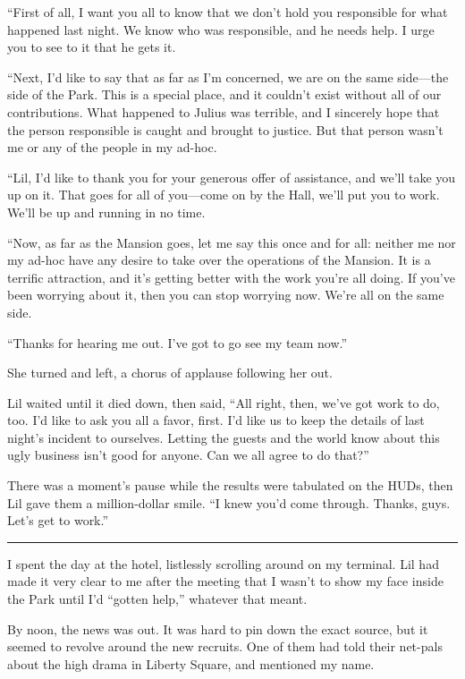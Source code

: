 “First of all, I want you all to know that we don't hold you
responsible for what happened last night. We know who was
responsible, and he needs help. I urge you to see to it that he
gets it.

“Next, I'd like to say that as far as I'm concerned, we are on the
same side—the side of the Park. This is a special place, and it
couldn't exist without all of our contributions. What happened to
Julius was terrible, and I sincerely hope that the person
responsible is caught and brought to justice. But that person
wasn't me or any of the people in my ad-hoc.

“Lil, I'd like to thank you for your generous offer of assistance,
and we'll take you up on it. That goes for all of you—come on by
the Hall, we'll put you to work. We'll be up and running in no
time.

“Now, as far as the Mansion goes, let me say this once and for all:
neither me nor my ad-hoc have any desire to take over the
operations of the Mansion. It is a terrific attraction, and it's
getting better with the work you're all doing. If you've been
worrying about it, then you can stop worrying now. We're all on the
same side.

“Thanks for hearing me out. I've got to go see my team now.”

She turned and left, a chorus of applause following her out.

Lil waited until it died down, then said, “All right, then, we've
got work to do, too. I'd like to ask you all a favor, first. I'd
like us to keep the details of last night's incident to ourselves.
Letting the guests and the world know about this ugly business
isn't good for anyone. Can we all agree to do that?”

There was a moment's pause while the results were tabulated on the
HUDs, then Lil gave them a million-dollar smile. “I knew you'd come
through. Thanks, guys. Let's get to work.”

\begin{center}\rule{3in}{0.4pt}\end{center}

I spent the day at the hotel, listlessly scrolling around on my
terminal. Lil had made it very clear to me after the meeting that I
wasn't to show my face inside the Park until I'd “gotten help,”
whatever that meant.

By noon, the news was out. It was hard to pin down the exact
source, but it seemed to revolve around the new recruits. One of
them had told their net-pals about the high drama in Liberty
Square, and mentioned my name.

